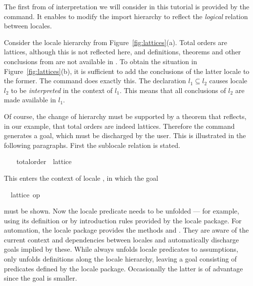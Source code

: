 \begin{isabellebody}
\begin{isamarkuptext}
  The first from of interpretation we will consider in this tutorial
  is provided by the  command.  It enables to
  modify the import hierarchy to reflect the \emph{logical} relation
  between locales.

  Consider the locale hierarchy from Figure~\ref{fig:lattices}(a).
  Total orders are lattices, although this is not reflected here, and
  definitions, theorems and other conclusions
  from  are not available in .  To
  obtain the situation in Figure~\ref{fig:lattices}(b), it is
  sufficient to add the conclusions of the latter locale to the former.
  The  command does exactly this.
  The declaration  $l_1
  \subseteq l_2$ causes locale $l_2$ to be \emph{interpreted} in the
  context of $l_1$.  This means that all conclusions of $l_2$ are made
  available in $l_1$.

  Of course, the change of hierarchy must be supported by a theorem
  that reflects, in our example, that total orders are indeed
  lattices.  Therefore the  command generates a
  goal, which must be discharged by the user.  This is illustrated in
  the following paragraphs.  First the sublocale relation is stated.%
\end{isamarkuptext}%
\isamarkuptrue%
%
\isadelimvisible
\ \ %
\endisadelimvisible
%
\isatagvisible
{}\isamarkupfalse%
\ total{\isacharunderscore}order\ {\isasymsubseteq}\ lattice%
\begin{isamarkuptxt}%
\normalsize
  This enters the context of locale , in
  which the goal \begin{isabelle}%
\ {}{\isachardot}\ lattice\ op\ {\isasymsqsubseteq}%
\end{isabelle} must be shown.
  Now the
  locale predicate needs to be unfolded --- for example, using its
  definition or by introduction rules
  provided by the locale package.  For automation, the locale package
  provides the methods  and .  They are aware of the
  current context and dependencies between locales and automatically
  discharge goals implied by these.  While 
  always unfolds locale predicates to assumptions,  only unfolds definitions along the locale
  hierarchy, leaving a goal consisting of predicates defined by the
  locale package.  Occasionally the latter is of advantage since the goal
  is smaller.


\end{isamarkuptxt}
\end{isabellebody}
